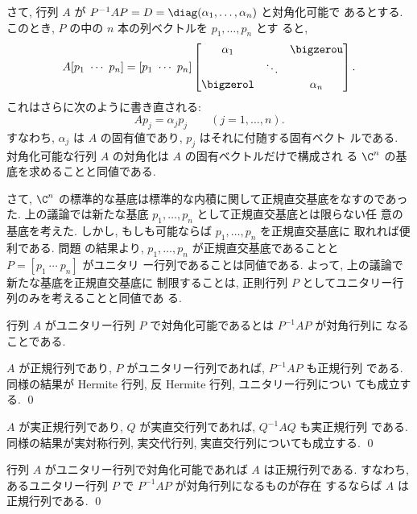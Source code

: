 \documentclass[12pt,twoside]{jarticle}
\begin{document}
さて, 行列 $A$ が $P^{-1}AP=D=\diag(\alpha_1,\dots,\alpha_n)$ と対角化可能で
あるとする.  このとき, $P$ の中の $n$ 本の列ベクトルを $p_1,\dots,p_n$ とす
ると, 
\begin{equation*}
  A [p_1\ \cdots\ p_n] = 
  [p_1\ \cdots\ p_n]
  \begin{bmatrix}
    \alpha_1  &        & \bigzerou \\
              & \ddots &           \\
    \bigzerol &        & \alpha_n  \\
  \end{bmatrix}.
\end{equation*}
これはさらに次のように書き直される:
\begin{equation*}
  A p_j = \alpha_j p_j \qquad (j=1,\dots,n).
\end{equation*}
すなわち, $\alpha_j$ は $A$ の固有値であり, $p_j$ はそれに付随する固有ベクト
ルである.  対角化可能な行列 $A$ の対角化は $A$ の固有ベクトルだけで構成され
る $\C^n$ の基底を求めることと同値である.  

さて, $\C^n$ の標準的な基底は標準的な内積に関して正規直交基底をなすのであっ
た.  上の議論では新たな基底 $p_1,\dots,p_n$ として正規直交基底とは限らない任
意の基底を考えた.  しかし, もしも可能ならば $p_1,\dots,p_n$ を正規直交基底に
取れれば便利である.  問題  の結果より, 
$p_1,\dots,p_n$ が正規直交基底であることと $P=[p_1\ \cdots\ p_n]$ がユニタリ
ー行列であることは同値である.  よって, 上の議論で新たな基底を正規直交基底に
制限することは, 正則行列 $P$ としてユニタリー行列のみを考えることと同値であ
る.

行列 $A$ がユニタリー行列 $P$ で対角化可能であるとは $P^{-1}AP$ が対角行列に
なることである.

\begin{question}
  $A$ が正規行列であり, $P$ がユニタリー行列であれば, $P^{-1}AP$ も正規行列
  である.  同様の結果が Hermite 行列, 反 Hermite 行列, ユニタリー行列につい
  ても成立する.
  \qed
\end{question}

\begin{question}
  $A$ が実正規行列であり, $Q$ が実直交行列であれば, $Q^{-1}AQ$ も実正規行列
  である.  同様の結果が実対称行列, 実交代行列, 実直交行列についても成立する.
  \qed
\end{question}

\begin{question}
\label{q:Toeplitz-easy}
  行列 $A$ がユニタリー行列で対角化可能であれば $A$ は正規行列である. 
  すなわち, あるユニタリー行列 $P$ で $P^{-1}AP$ が対角行列になるものが存在
  するならば $A$ は正規行列である.
  \qed
\end{question}
\end{document}

